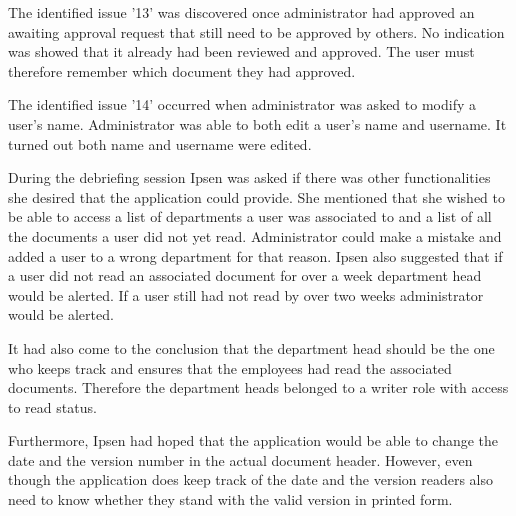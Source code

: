The identified issue '13' was discovered once administrator had approved an awaiting approval request that still need to be approved by others.
No indication was showed that it already had been reviewed and approved.
The user must therefore remember which document they had approved.

The identified issue '14' occurred when administrator was asked to modify a user's name.
Administrator was able to both edit a user's name and username.
It turned out both name and username were edited.


During the debriefing session Ipsen was asked if there was other functionalities she desired that the application could provide.
She mentioned that she wished to be able to access a list of departments a user was associated to and a list of all the documents a user did not yet read.
Administrator could make a mistake and added a user to a wrong department for that reason.
Ipsen also suggested that if a user did not read an associated document for over a week department head would be alerted.
If a user still had not read by over two weeks administrator would be alerted.

It had also come to the conclusion that the department head should be the one who keeps track and ensures that the employees had read the associated documents.
Therefore the department heads belonged to a writer role with access to read status.

Furthermore, Ipsen had hoped that the application would be able to change the date and the version number in the actual document header.
However, even though the application does keep track of the date and the version readers also need to know whether they stand with the valid version in printed form.

